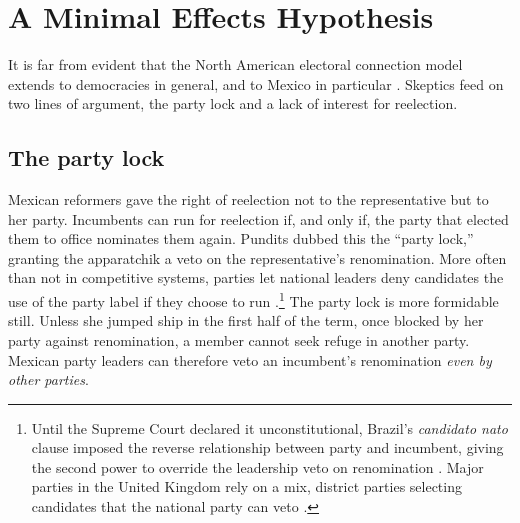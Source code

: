 \documentclass[letter,12pt]{article}
\begin{document}

\section{A Minimal Effects Hypothesis}

It is far from evident that the North American electoral connection model extends to democracies in general, and to Mexico in particular \citep{samuels.2003,jones.etal.amateurLegis.2002}. Skeptics feed on two lines of argument, the party lock and a lack of interest for reelection.

\subsection{The party lock}


Mexican reformers gave the right of reelection not to the representative but to her party. Incumbents can run for reelection if, and only if, the party that elected them to office nominates them again. Pundits dubbed this the ``party lock,'' granting the apparatchik a veto on the representative's renomination. More often than not in competitive systems, parties let national leaders deny candidates the use of the party label if they choose to run \citep[:85]{ranney.cand-sel.1981}.\footnote{Until the Supreme Court declared it unconstitutional, Brazil's \emph{candidato nato} clause imposed the reverse relationship between party and incumbent, giving the second power to override the leadership veto on renomination \citep{mainwaring.1991}. Major parties in the United Kingdom rely on a mix, district parties selecting candidates that the national party can veto \citep{mikulska.uk.cand.sel2010}.} The party lock is more formidable still. Unless she jumped ship in the first half of the term, once blocked by her party against renomination, a member cannot seek refuge in another party. Mexican party leaders can therefore veto an incumbent's renomination \emph{even by other parties}. 
\end{document}
